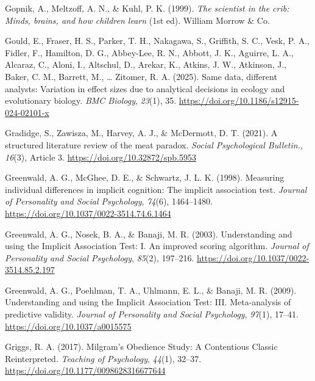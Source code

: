 \documentclass[
  letterpaper,
]{book}
\newlength{\cslhangindent}
\newenvironment{CSLReferences}[2] %
 {\begin{list}{}{%
  \setlength{\itemindent}{0pt}
  \setlength{\leftmargin}{0pt}
  \setlength{\parsep}{0pt}
  \ifodd #1
   \setlength{\leftmargin}{\cslhangindent}
   \setlength{\itemindent}{-1\cslhangindent}
  \fi
  \setlength{\itemsep}{#2\baselineskip}}}
 {\end{list}}
\begin{document}
\begin{CSLReferences}{1}{0}
Gopnik, A., Meltzoff, A. N., \& Kuhl, P. K. (1999). \emph{The scientist
in the crib: Minds, brains, and how children learn} (1st ed). William
Morrow \& Co.

Gould, E., Fraser, H. S., Parker, T. H., Nakagawa, S., Griffith, S. C.,
Vesk, P. A., Fidler, F., Hamilton, D. G., Abbey-Lee, R. N., Abbott, J.
K., Aguirre, L. A., Alcaraz, C., Aloni, I., Altschul, D., Arekar, K.,
Atkins, J. W., Atkinson, J., Baker, C. M., Barrett, M., \ldots{}
Zitomer, R. A. (2025). Same data, different analysts: Variation in
effect sizes due to analytical decisions in ecology and evolutionary
biology. \emph{BMC Biology}, \emph{23}(1), 35.
\url{https://doi.org/10.1186/s12915-024-02101-x}

Gradidge, S., Zawisza, M., Harvey, A. J., \& McDermott, D. T. (2021). A
structured literature review of the meat paradox. \emph{Social
Psychological Bulletin.}, \emph{16}(3), Article 3.
\href{https://doi.org/10.32872/spb.5953\%20}{https://doi.org/10.32872/spb.5953
}

Greenwald, A. G., McGhee, D. E., \& Schwartz, J. L. K. (1998). Measuring
individual differences in implicit cognition: {The} implicit association
test. \emph{Journal of Personality and Social Psychology}, \emph{74}(6),
1464--1480. \url{https://doi.org/10.1037/0022-3514.74.6.1464}

Greenwald, A. G., Nosek, B. A., \& Banaji, M. R. (2003). Understanding
and using the {Implicit Association Test}: {I}. {An} improved scoring
algorithm. \emph{Journal of Personality and Social Psychology},
\emph{85}(2), 197--216. \url{https://doi.org/10.1037/0022-3514.85.2.197}

Greenwald, A. G., Poehlman, T. A., Uhlmann, E. L., \& Banaji, M. R.
(2009). Understanding and using the {Implicit Association Test}: {III}.
{Meta}-analysis of predictive validity. \emph{Journal of Personality and
Social Psychology}, \emph{97}(1), 17--41.
\url{https://doi.org/10.1037/a0015575}

Griggs, R. A. (2017). Milgram's {Obedience} {Study}: {A} {Contentious}
{Classic} {Reinterpreted}. \emph{Teaching of Psychology}, \emph{44}(1),
32--37. \url{https://doi.org/10.1177/0098628316677644}


\end{CSLReferences}
\end{document}
